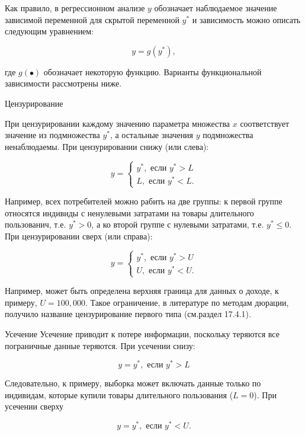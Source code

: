 Как правило, в регрессионном анализе $y$ обозначает наблюдаемое значение зависимой переменной для скрытой переменной $y^{*}$ и зависимость можно описать следующим уравнением:

\[
y=g(y^{*}),
\]

где $g(\bullet)$ обозначает некоторую функцию. Варианты функциональной зависимости рассмотрены ниже. 


Цензурирование


При цензурировании каждому значению параметра множества $x$ соответствует значение из подмножества $y^{*}$, а остальные значения $y$ подмножества ненаблюдаемы. При цензурировании снижу (или слева):

\begin{equation}
y=
\begin{cases}
y^{*}, \text{ если } y^{*}>L\\
L, \text{ если }y^{*}<L.
\end{cases}
\end{equation}

Например, всех потребителей можно рабить на две группы: к первой группе относятся индивиды с ненулевыми затратами на товары длительного пользованич, т.е. $y^{*}>0$, а ко второй группе с нулевыми затратами, т.е. $y^{*}{\leq}0$. При цензурировании сверх (или справа):

\begin{equation}
y=
	\begin{cases}
	y^{*},	 \text{ если }y^{*}>U\\
	U,		\text{ если }y^{*}<U.
	\end{cases}
\end{equation}

Например, может быть определена верхняя граница для данных о доходе, к примеру, $U=100,000$. Такое ограничение, в литературе по методам дюрации, получило название цензурирование первого типа (см.раздел 17.4.1). 


Усечение
Усечение приводит к потере информации, поскольку теряются все пограничные данные теряются. При усечении снизу:

\begin{equation}
y=y^{*}, \text{ если } y^{*}>L
\end{equation}

Следовательно, к примеру, выборка может включать данные только по индивидам, которые купили товары длительного пользования ($L=0$). При усечении сверху

\begin{equation}
y=y^{*}, \text{ если } y^{*}<U.
\end{equation}


